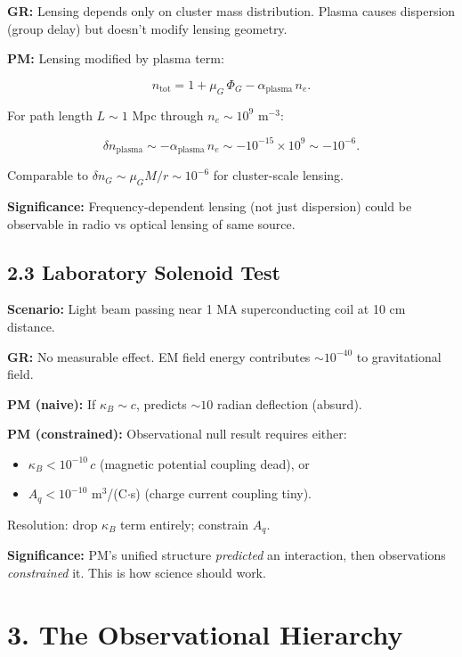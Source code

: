 \documentclass{article}
\begin{document}
\textbf{GR:} Lensing depends only on cluster mass distribution. Plasma causes
dispersion (group delay) but doesn't modify lensing geometry.

\textbf{PM:} Lensing modified by plasma term:



\[
n_{\text{tot}}
= 1 + \mu_G\,\Phi_G - \alpha_{\text{plasma}}\,n_e.
\]



For path length $L \sim 1$ Mpc through $n_e \sim 10^9$ m$^{-3}$:



\[
\delta n_{\text{plasma}}
\sim -\alpha_{\text{plasma}}\,n_e
\sim -10^{-15}\times 10^9
\sim -10^{-6}.
\]



Comparable to $\delta n_G \sim \mu_G M / r \sim 10^{-6}$ for cluster-scale
lensing.

\textbf{Significance:} Frequency-dependent lensing (not just dispersion) could
be observable in radio vs optical lensing of same source.

\subsection*{2.3 Laboratory Solenoid Test}

\textbf{Scenario:} Light beam passing near 1 MA superconducting coil at 10 cm
distance.

\textbf{GR:} No measurable effect. EM field energy contributes $\sim 10^{-40}$
to gravitational field.

\textbf{PM (naive):} If $\kappa_B \sim c$, predicts $\sim 10$ radian deflection
(absurd).

\textbf{PM (constrained):} Observational null result requires either:

\begin{itemize}
    \item $\kappa_B < 10^{-10}\,c$ (magnetic potential coupling dead), or
    \item $A_q < 10^{-10}$ m$^3$/(C$\cdot$s) (charge current coupling tiny).
\end{itemize}

Resolution: drop $\kappa_B$ term entirely; constrain $A_q$.

\textbf{Significance:} PM's unified structure \emph{predicted} an interaction,
then observations \emph{constrained} it. This is how science should work.

\section*{3. The Observational Hierarchy}
\end{document}

